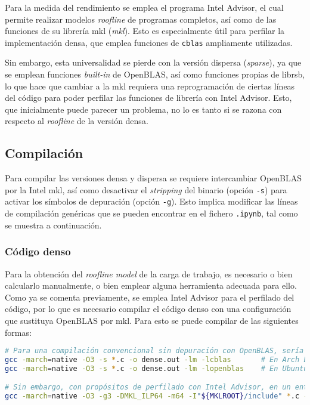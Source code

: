 Para la medida del rendimiento se emplea el programa Intel Advisor, el cual permite realizar modelos \textit{roofline} de programas completos, así como de las funciones de su librería \acrshort{mkl} (\textit{\acrlong{mkl}}). Esto es especialmente útil para perfilar la implementación densa, que emplea funciones de \texttt{cblas} ampliamente utilizadas.

Sin embargo, esta universalidad se pierde con la versión dispersa (\textit{sparse}), ya que se emplean funciones \textit{built-in} de OpenBLAS, así como funciones propias de librsb, lo que hace que cambiar a la \acrshort{mkl} requiera una reprogramación de ciertas líneas del código para poder perfilar las funciones de librería con Intel Advisor. Esto, que inicialmente puede parecer un problema, no lo es tanto si se razona con respecto al \textit{roofline} de la versión densa.

\subsection{Compilación}
\label{ssec:compilacion_medida}
Para compilar las versiones densa y dispersa se requiere intercambiar OpenBLAS por la Intel \acrshort{mkl}, así como desactivar el \textit{stripping} del binario (opción \texttt{-s}) para activar los símbolos de depuración (opción \texttt{-g}). Esto implica modificar las líneas de compilación genéricas que se pueden encontrar en el fichero \texttt{.ipynb}, tal como se muestra a continuación.

\subsubsection{Código denso}
Para la obtención del \textit{roofline model} de la carga de trabajo, es necesario o bien calcularlo manualmente, o bien emplear alguna herramienta adecuada para ello. Como ya se comenta previamente, se emplea Intel Advisor para el perfilado del código, por lo que es necesario compilar el código denso con una configuración que sustituya OpenBLAS por \acrshort{mkl}. Para esto se puede compilar de las siguientes formas:

\begin{lstlisting}[language=bash]
# Para una compilación convencional sin depuración con OpenBLAS, sería necesario únicamente ejecutar
gcc -march=native -O3 -s *.c -o dense.out -lm -lcblas       # En Arch Linux
gcc -march=native -O3 -s *.c -o dense.out -lm -lopenblas    # En Ubuntu

# Sin embargo, con propósitos de perfilado con Intel Advisor, en un entorno bash donde se haya realizado `source /opt/intel/oneapi/setvar.sh` se ha de compilar con:
gcc -march=native -O3 -g3 -DMKL_ILP64 -m64 -I"${MKLROOT}/include" *.c -o dense.out -L${MKLROOT}/lib/intel64 -Wl,--no-as-needed -lmkl_intel_ilp64 -lmkl_gnu_thread -lmkl_core -lgomp -lpthread -lm -ldl
\end{lstlisting}

